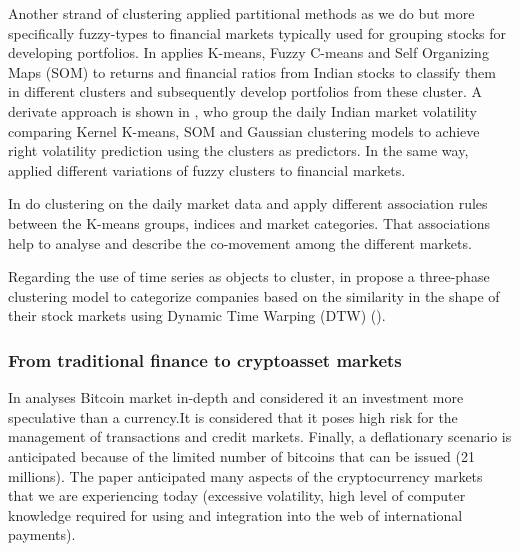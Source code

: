 \documentclass{bmcart}
\begin{document}
Another strand of clustering applied partitional methods as we do but more specifically fuzzy-types to financial markets typically used for grouping stocks for developing portfolios. In \cite{Nanda2010ClusteringIS} applies K-means, Fuzzy C-means  and Self Organizing Maps (SOM) to returns and financial ratios from Indian stocks to  classify  them in  different clusters  and  subsequently  develop  portfolios  from  these cluster. A derivate approach is shown in \cite{Tamal2015}, who group the daily Indian market volatility comparing Kernel K-means, SOM and Gaussian clustering models to achieve right volatility prediction using the clusters as predictors. In the same way,  applied different variations of fuzzy clusters to financial markets. 

In \cite{Liao2007MarketClustering, Liao2013TaiwanChinaStocks5} do clustering on the daily market data and apply different association rules between the K-means groups, indices and market categories. That associations help to analyse and describe the co-movement among the different markets.

Regarding the use of time series as objects to cluster, in \cite{Aghabozorhi2013ThreePhases} propose a three-phase clustering model to categorize companies based on the similarity in the shape of their stock markets using Dynamic Time Warping (DTW) (\cite{DisimilDTW1994}). 

\subsubsection*{From  traditional finance to cryptoasset markets}

In \cite{NBER2013} analyses Bitcoin market in-depth and considered it an investment more speculative than a currency.It is considered that it poses high risk for the management of transactions and credit markets. Finally, a deflationary scenario is anticipated because of the limited number of bitcoins that can be issued (21 millions). The paper anticipated many aspects of the cryptocurrency markets that we are experiencing today (excessive volatility, high level of computer knowledge required for using and integration into the web of international payments).
\end{document}
